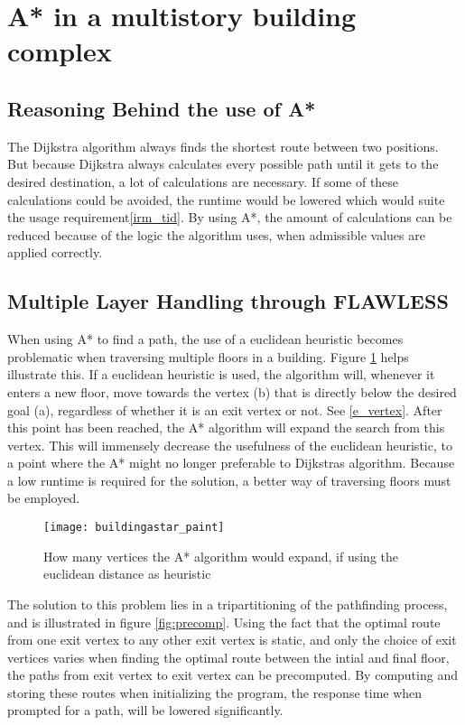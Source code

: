 \section{A* in a multistory building complex}

\subsection{Reasoning Behind the use of A*}
The Dijkstra algorithm always finds the shortest route between two positions. But because Dijkstra always calculates every possible path until it gets to the desired destination, a lot of calculations are necessary. If some of these calculations could be avoided, the runtime would be lowered which would suite the usage requirement\cref{irm_tid}. By using A*, the amount of calculations can be reduced because of the logic the algorithm uses, when admissible values are applied correctly.

\subsection{Multiple Layer Handling through FLAWLESS} \label{multlayhan}

When using A* to find a path, the use of a euclidean heuristic becomes problematic when traversing multiple floors in a building. Figure \ref{fig:buildingAstar} helps illustrate this. If a euclidean heuristic is used, the algorithm will, whenever it enters a new floor, move towards the vertex (b) that is directly below the desired goal (a), regardless of whether it is an exit vertex or not. See \cref{e_vertex}. After this point has been reached, the A* algorithm will expand the search from this vertex. This will immensely decrease the usefulness of the euclidean heuristic, to a point where the A* might no longer preferable to Dijkstras algorithm. Because a low runtime is required for the solution, a better way of traversing floors must be employed.

\begin{figure}[ht!]
    \centering
    \texttt{[image: buildingastar\_paint]}
    \caption{How many vertices the A* algorithm would expand, if using the euclidean distance as heuristic}
    \label{fig:buildingAstar}
  \end{figure}

The solution to this problem lies in a tripartitioning of the pathfinding process, and is illustrated in figure \ref{fig:precomp}. Using the fact that the optimal route from one exit vertex to any other exit vertex is static, and only the choice of exit vertices varies when finding the optimal route between the intial and final floor, the paths from exit vertex to exit vertex can be precomputed. By computing and storing these routes when initializing the program, the response time when prompted for a path, will be lowered significantly.

